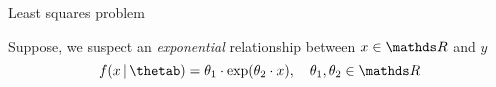 \documentclass[11pt,compress,t,notes=noshow, xcolor=table]{beamer}
\begin{document}
\begin{vbframe}{Least squares problem}





\framebreak

Suppose, we suspect an \textit{exponential} relationship between $x \in \R$ and $y$ 
\begin{equation*}
    f(x \,|\, \thetab) = \theta_1 \cdot \exp(\theta_2 \cdot x), \quad \theta_1, \theta_2 \in \R
\end{equation*}





\end{vbframe}
\end{document}
